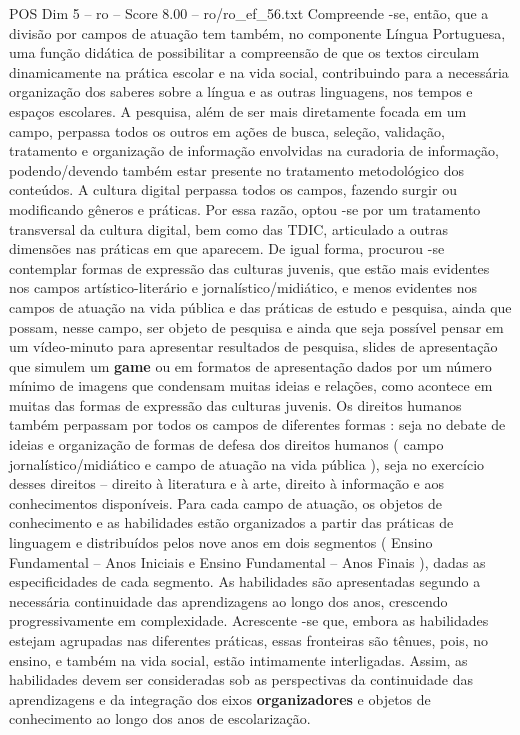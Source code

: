 \begin{textsample}{POS Dim 5 – ro – Score 8.00 – ro/ro\_ef\_56.txt}
Compreende -se, então, que a divisão por campos de atuação tem também, no componente Língua Portuguesa, uma função didática de possibilitar a compreensão de que os textos circulam dinamicamente na prática escolar e na vida social, contribuindo para a necessária organização dos saberes sobre a língua e as outras linguagens, nos tempos e espaços escolares.
A pesquisa, além de ser mais diretamente focada em um campo, perpassa todos os outros em ações de busca, seleção, validação, tratamento e organização de informação envolvidas na curadoria de informação, podendo/devendo também estar presente no tratamento metodológico dos conteúdos.
A cultura digital perpassa todos os campos, fazendo surgir ou modificando gêneros e práticas.
Por essa razão, optou -se por um tratamento transversal da cultura digital, bem como das TDIC, articulado a outras dimensões nas práticas em que aparecem.
De igual forma, procurou -se contemplar formas de expressão das culturas juvenis, que estão mais evidentes nos campos artístico-literário e jornalístico/midiático, e menos evidentes nos campos de atuação na vida pública e das práticas de estudo e pesquisa, ainda que possam, nesse campo, ser objeto de pesquisa e ainda que seja possível pensar em um vídeo-minuto para apresentar resultados de pesquisa, slides de apresentação que simulem um \textbf{game} ou em formatos de apresentação dados por um número mínimo de imagens que condensam muitas ideias e relações, como acontece em muitas das formas de expressão das culturas juvenis.
Os direitos humanos também perpassam por todos os campos de diferentes formas : seja no debate de ideias e organização de formas de defesa dos direitos humanos ( campo jornalístico/midiático e campo de atuação na vida pública ), seja no exercício desses direitos – direito à literatura e à arte, direito à informação e aos conhecimentos disponíveis.
Para cada campo de atuação, os objetos de conhecimento e as habilidades estão organizados a partir das práticas de linguagem e distribuídos pelos nove anos em dois segmentos ( Ensino Fundamental – Anos Iniciais e Ensino Fundamental – Anos Finais ), dadas as especificidades de cada segmento.
As habilidades são apresentadas segundo a necessária continuidade das aprendizagens ao longo dos anos, crescendo progressivamente em complexidade.
Acrescente -se que, embora as habilidades estejam agrupadas nas diferentes práticas, essas fronteiras são tênues, pois, no ensino, e também na vida social, estão intimamente interligadas.
Assim, as habilidades devem ser consideradas sob as perspectivas da continuidade das aprendizagens e da integração dos eixos \textbf{organizadores} e objetos de conhecimento ao longo dos anos de escolarização.

\end{textsample}
